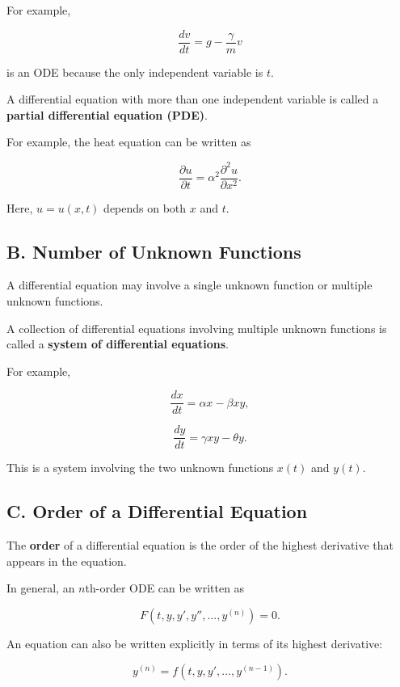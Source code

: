 \documentclass[11pt]{article}
\begin{document}
For example,

\[
\frac{dv}{dt}
=
g-\frac{\gamma}{m}v
\]

is an ODE because the only independent variable is $t$.

A differential equation with more than one independent variable is
called a \textbf{partial differential equation (PDE)}.

For example, the heat equation can be written as

\[
\boxed{
\frac{\partial u}{\partial t}
=
\alpha^2
\frac{\partial^2u}{\partial x^2}
}.
\]

Here, $u=u(x,t)$ depends on both $x$ and $t$.

\subsection{B. Number of Unknown Functions}

A differential equation may involve a single unknown function or
multiple unknown functions.

A collection of differential equations involving multiple unknown
functions is called a \textbf{system of differential equations}.

For example,

\[
\frac{dx}{dt}
=
\alpha x-\beta xy,
\]

\[
\frac{dy}{dt}
=
\gamma xy-\theta y.
\]

This is a system involving the two unknown functions $x(t)$ and $y(t)$.

\subsection{C. Order of a Differential Equation}

The \textbf{order} of a differential equation is the order of the
highest derivative that appears in the equation.

In general, an $n$th-order ODE can be written as

\[
F\left(
t,y,y',y'',\ldots,y^{(n)}
\right)=0.
\]

An equation can also be written explicitly in terms of its highest
derivative:

\[
y^{(n)}
=
f\left(
t,y,y',\ldots,y^{(n-1)}
\right).
\]
\end{document}
